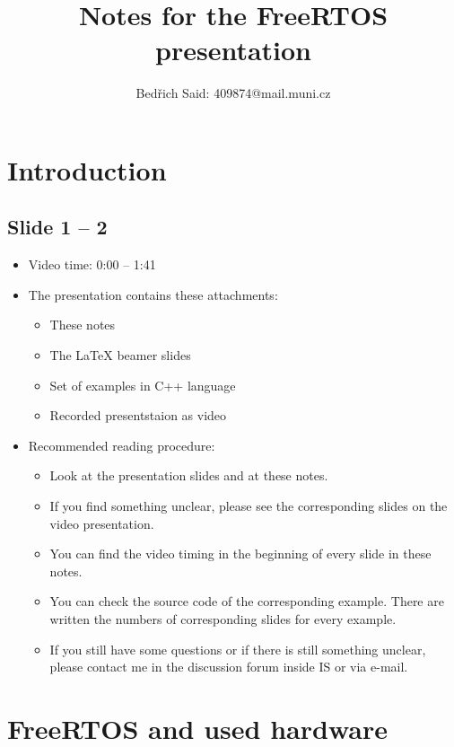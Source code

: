 \documentclass[12pt, a4paper]{article}
\title{Notes for the FreeRTOS presentation}
\author{Bed\v{r}ich Said: 409874@mail.muni.cz}
\begin{document}
	\maketitle
	\tableofcontents

	\section{Introduction}
	\subsection{Slide 1 -- 2}
	\begin{itemize}
		\item Video time: 0:00 -- 1:41
		\item The presentation contains these attachments:
		\begin{itemize}
			\item These notes
			\item The LaTeX beamer slides
			\item Set of examples in C++ language
			\item Recorded presentstaion as video
		\end{itemize}
		\item Recommended reading procedure:
		\begin{itemize}
			\item Look at the presentation slides and at these notes.
			\item If you find something unclear, please see the corresponding slides on the video presentation.
			\item You can find the video timing in the beginning of every slide in these notes.
			\item You can check the source code of the corresponding example. There are written the numbers of corresponding slides for every example.
			\item If you still have some questions or if there is still something unclear, please contact me in the discussion forum inside IS or via e-mail.
		\end{itemize}
	\end{itemize}

	\section{FreeRTOS and used hardware}
\end{document}
